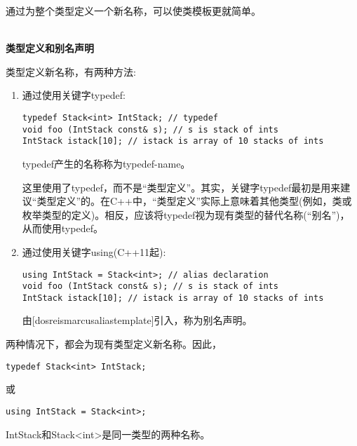 
通过为整个类型定义一个新名称，可以使类模板更就简单。

\hspace*{\fill} \\ %
\noindent
\textbf{类型定义和别名声明}

类型定义新名称，有两种方法:

\begin{enumerate}
\item
通过使用关键字typedef:

\begin{lstlisting}[style=styleCXX]
typedef Stack<int> IntStack; // typedef
void foo (IntStack const& s); // s is stack of ints
IntStack istack[10]; // istack is array of 10 stacks of ints
\end{lstlisting}

typedef产生的名称称为typedef-name。

\begin{tcolorbox}[colback=webgreen!5!white,colframe=webgreen!75!black]
\hspace*{0.75cm}这里使用了typedef，而不是“类型定义”。其实，关键字typedef最初是用来建议“类型定义”的。在C++中，“类型定义”实际上意味着其他类型(例如，类或枚举类型的定义)。相反，应该将typedef视为现有类型的替代名称(“别名”)，从而使用typedef。
\end{tcolorbox}

\item
通过使用关键字using(C++11起):

\begin{lstlisting}[style=styleCXX]
using IntStack = Stack<int>; // alias declaration
void foo (IntStack const& s); // s is stack of ints
IntStack istack[10]; // istack is array of 10 stacks of ints
\end{lstlisting}

由[dosreismarcusaliastemplate]引入，称为别名声明。

\end{enumerate}

两种情况下，都会为现有类型定义新名称。因此，

\begin{lstlisting}[style=styleCXX]
typedef Stack<int> IntStack;
\end{lstlisting}

或

\begin{lstlisting}[style=styleCXX]
using IntStack = Stack<int>;
\end{lstlisting}

IntStack和Stack<int>是同一类型的两种名称。

